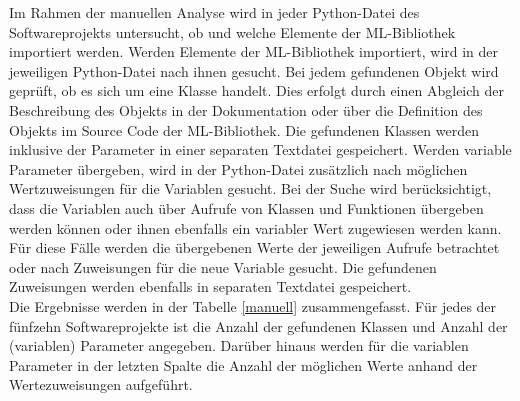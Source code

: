 \documentclass[german,bachelor]{swsLeipzig}
\begin{document}
Im Rahmen der manuellen Analyse wird in jeder Python-Datei des Softwareprojekts untersucht, ob und welche Elemente der ML-Bibliothek
importiert werden.
Werden Elemente der ML-Bibliothek importiert, wird in der jeweiligen Python-Datei nach ihnen gesucht.
Bei jedem gefundenen Objekt wird geprüft, ob es sich um eine Klasse handelt.
Dies erfolgt durch einen Abgleich der Beschreibung des Objekts in der Dokumentation oder
über die Definition des Objekts im Source Code der ML-Bibliothek.
Die gefundenen Klassen werden inklusive der Parameter in einer separaten Textdatei gespeichert.
Werden variable Parameter übergeben, wird in der Python-Datei zusätzlich nach möglichen Wertzuweisungen für die Variablen gesucht.
Bei der Suche wird berücksichtigt, dass die Variablen auch über Aufrufe von Klassen und Funktionen übergeben werden können oder ihnen ebenfalls ein
variabler Wert zugewiesen werden kann.
Für diese Fälle werden die übergebenen Werte der jeweiligen Aufrufe betrachtet oder nach Zuweisungen für die neue Variable gesucht.
Die gefundenen Zuweisungen werden ebenfalls in separaten Textdatei gespeichert.\\

Die Ergebnisse werden in der Tabelle \ref{manuell} zusammengefasst.
Für jedes der fünfzehn Softwareprojekte ist die Anzahl der gefundenen Klassen und Anzahl der
(variablen) Parameter angegeben.
Darüber hinaus werden für die variablen Parameter in der letzten Spalte die Anzahl der möglichen Werte anhand
der Wertezuweisungen aufgeführt.
\end{document}
